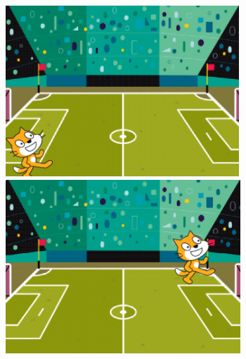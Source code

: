 \documentclass[10pt, a4paper]{article}
\begin{document}
\begin{enumerate}
\begin{figure}[htb]
\begin{minipage}[t]{.23\textwidth}
                \includegraphics[width=\textwidth]{37-3.png}
            \end{minipage}
            \begin{minipage}[t]{.23\textwidth}
                \centering
                \includegraphics[width=\textwidth]{37-4.png}
            \end{minipage}
        \end{figure}
    \end{enumerate}
\end{document}
